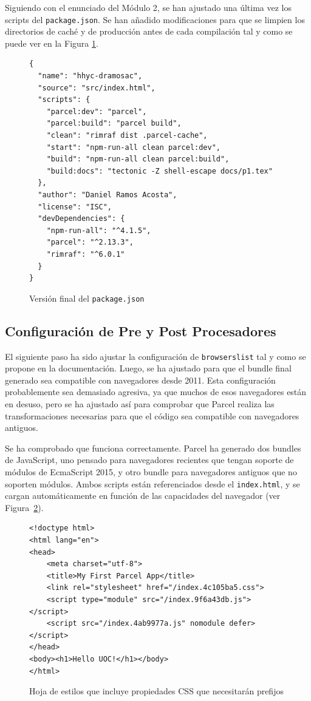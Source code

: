 \documentclass{article}
\begin{document}
Siguiendo con el enunciado del Módulo 2, se han ajustado una última vez los scripts del \lstinline|package.json|.
Se han añadido modificaciones para que se limpien los directorios de caché y de producción antes de cada compilación tal y como se puede ver en la Figura \ref{fig:package-json}.

\begin{figure}[h!]
\begin{verbatim}
{
  "name": "hhyc-dramosac",
  "source": "src/index.html",
  "scripts": {
    "parcel:dev": "parcel",
    "parcel:build": "parcel build",
    "clean": "rimraf dist .parcel-cache",
    "start": "npm-run-all clean parcel:dev",
    "build": "npm-run-all clean parcel:build",
    "build:docs": "tectonic -Z shell-escape docs/p1.tex"
  },
  "author": "Daniel Ramos Acosta",
  "license": "ISC",
  "devDependencies": {
    "npm-run-all": "^4.1.5",
    "parcel": "^2.13.3",
    "rimraf": "^6.0.1"
  }
}
\end{verbatim}
\caption{Versión final del \lstinline{package.json}}
\label{fig:package-json}
\end{figure}

\subsection{Configuración de Pre y Post Procesadores}\label{subsec:configuracion-de-pre-y-post-procesadores}

El siguiente paso ha sido ajustar la configuración de \lstinline|browserslist| tal y como se propone en la documentación.
Luego, se ha ajustado para que el bundle final generado sea compatible con navegadores desde 2011.
Esta configuración probablemente sea demasiado agresiva, ya que muchos de esos navegadores están en desuso, pero se ha ajustado así para comprobar que Parcel realiza las transformaciones necesarias para que el código sea compatible con navegadores antiguos.

Se ha comprobado que funciona correctamente.
Parcel ha generado dos bundles de JavaScript, uno pensado para navegadores recientes que tengan soporte de módulos de EcmaScript 2015, y otro bundle para navegadores antiguos que no soporten módulos.
Ambos scripts están referenciados desde el \lstinline|index.html|, y se cargan automáticamente en función de las capacidades del navegador (ver Figura~\ref{fig:index-html}).

\begin{figure}[h!]
\begin{verbatim}
<!doctype html>
<html lang="en">
<head>
    <meta charset="utf-8">
    <title>My First Parcel App</title>
    <link rel="stylesheet" href="/index.4c105ba5.css">
    <script type="module" src="/index.9f6a43db.js"></script>
    <script src="/index.4ab9977a.js" nomodule defer></script>
</head>
<body><h1>Hello UOC!</h1></body>
</html>
\end{verbatim}
\caption{Hoja de estilos que incluye propiedades CSS que necesitarán prefijos}
\label{fig:index-html}
\end{figure}
\end{document}
